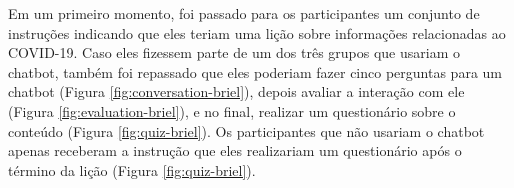 Em um primeiro momento, foi passado para os participantes um conjunto de instruções indicando que eles teriam uma lição sobre informações relacionadas ao COVID-19. Caso eles fizessem parte de um dos três grupos que usariam o chatbot, também foi repassado que eles poderiam fazer cinco perguntas para um chatbot (Figura \ref{fig:conversation-briel}), depois avaliar a interação com ele (Figura \ref{fig:evaluation-briel}), e no final, realizar um questionário sobre o conteúdo (Figura \ref{fig:quiz-briel}). Os participantes que não usariam o chatbot apenas receberam a instrução que eles realizariam um questionário após o término da lição (Figura \ref{fig:quiz-briel}).

\begin{figure}[ht] 
   	\captionsetup{width=16cm}
\end{figure}

\begin{figure}[ht] 
   	\captionsetup{width=16cm}
\end{figure}

